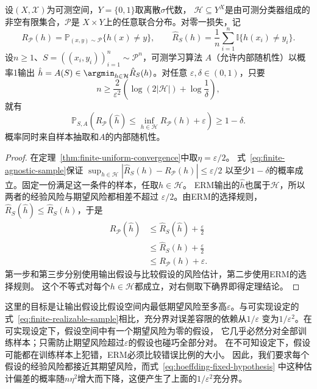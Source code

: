\begin{theorem}[有限假设空间的不可知PAC样本量界]
\label{thm:finite-agnostic-pac}
设$(X,\mathcal X)$为可测空间，$Y=\{0,1\}$取离散$\sigma$代数，
$\mathcal H\subseteq Y^X$是由可测分类器组成的非空有限集合，$\mathcal P$是
$X\times Y$上的任意联合分布。对零一损失，记
\[
 R_{\mathcal P}(h)=\mathbb P_{(x,y)\sim\mathcal P}\{h(x)\neq y\},\qquad
 \hat R_S(h)=\frac1n\sum_{i=1}^n\mathbb I\{h(x_i)\neq y_i\}.
\]
设$n\geq1$、$S=((x_i,y_i))_{i=1}^n\sim\mathcal P^n$，可测学习算法
$A$（允许内部随机性）以概率1输出
$\hat h=A(S)\in\argmin_{h\in\mathcal H}\hat R_S(h)$。对任意
$\varepsilon,\delta\in(0,1)$，只要
\begin{equation}
 n\geq\frac{2}{\varepsilon^2}
 \left(\log(2|\mathcal H|)+\log\frac1\delta\right),
 \label{eq:finite-agnostic-sample}
\end{equation}
就有
\[
 \mathbb P_{S,A}\left(
 R_{\mathcal P}(\hat h)\leq\inf_{h\in\mathcal H}R_{\mathcal P}(h)+\varepsilon
 \right)\geq1-\delta.
\]
概率同时来自样本抽取和$A$的内部随机性。
\end{theorem}

\begin{proof}
在定理~\ref{thm:finite-uniform-convergence}中取$\eta=\varepsilon/2$。
式~\eqref{eq:finite-agnostic-sample}保证
$\sup_{h\in\mathcal H}|\hat R_S(h)-R_{\mathcal P}(h)|\leq\varepsilon/2$
以至少$1-\delta$的概率成立。固定一份满足这一条件的样本，任取$h\in\mathcal H$。
ERM输出的$\hat h$也属于$\mathcal H$，所以两者的经验风险与期望风险都相差不超过
$\varepsilon/2$。由ERM的选择规则，$\hat R_S(\hat h)\leq\hat R_S(h)$，于是
\begin{align*}
 R_{\mathcal P}(\hat h)
 &\leq\hat R_S(\hat h)+\frac{\varepsilon}{2}\\
 &\leq\hat R_S(h)+\frac{\varepsilon}{2}\\
 &\leq R_{\mathcal P}(h)+\varepsilon.
\end{align*}
第一步和第三步分别使用输出假设与比较假设的风险估计，第二步使用ERM的选择规则。
这个不等式对每个$h\in\mathcal H$都成立，对右侧取下确界即得定理结论。
\end{proof}

这里的目标是让输出假设比假设空间内最低期望风险至多高$\varepsilon$。与可实现设定的
式~\eqref{eq:finite-realizable-sample}相比，充分界对误差容限的依赖从$1/\varepsilon$
变为$1/\varepsilon^2$。在可实现设定下，假设空间中有一个期望风险为零的假设，
它几乎必然分对全部训练样本；只需防止期望风险超过$\varepsilon$的假设也碰巧全部分对。
在不可知设定下，假设可能都在训练样本上犯错，ERM必须比较错误比例的大小。
因此，我们要求每个假设的经验风险都接近其期望风险，而式~\eqref{eq:hoeffding-fixed-hypothesis}
中这种估计偏差的概率随$n\eta^2$增大而下降，这便产生了上面的$1/\varepsilon^2$充分界。

